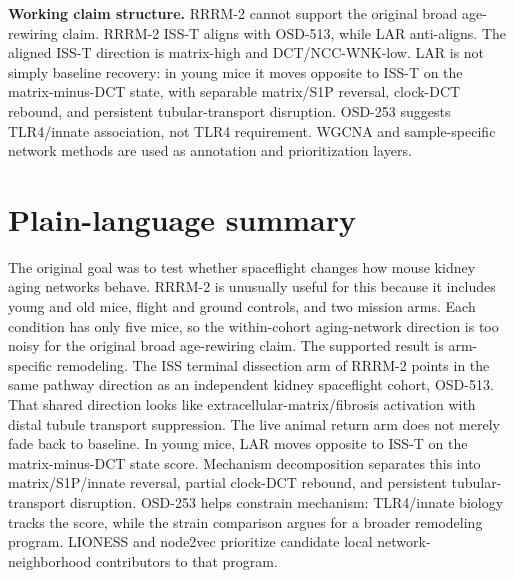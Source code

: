 \documentclass[11pt]{article}
\begin{document}
\vspace{0.8em}
\noindent\textbf{Working claim structure.}
RRRM-2 cannot support the original broad age-rewiring claim. RRRM-2 ISS-T aligns with OSD-513, while LAR anti-aligns. The aligned ISS-T direction is matrix-high and DCT/NCC-WNK-low. LAR is not simply baseline recovery: in young mice it moves opposite to ISS-T on the matrix-minus-DCT state, with separable matrix/S1P reversal, clock-DCT rebound, and persistent tubular-transport disruption. OSD-253 suggests TLR4/innate association, not TLR4 requirement. WGCNA and sample-specific network methods are used as annotation and prioritization layers.

\clearpage

\section*{Plain-language summary}

\noindent
The original goal was to test whether spaceflight changes how mouse kidney aging networks behave. RRRM-2 is unusually useful for this because it includes young and old mice, flight and ground controls, and two mission arms. Each condition has only five mice, so the within-cohort aging-network direction is too noisy for the original broad age-rewiring claim. The supported result is arm-specific remodeling. The ISS terminal dissection arm of RRRM-2 points in the same pathway direction as an independent kidney spaceflight cohort, OSD-513. That shared direction looks like extracellular-matrix/fibrosis activation with distal tubule transport suppression. The live animal return arm does not merely fade back to baseline. In young mice, LAR moves opposite to ISS-T on the matrix-minus-DCT state score. Mechanism decomposition separates this into matrix/S1P/innate reversal, partial clock-DCT rebound, and persistent tubular-transport disruption. OSD-253 helps constrain mechanism: TLR4/innate biology tracks the score, while the strain comparison argues for a broader remodeling program. LIONESS and node2vec prioritize candidate local network-neighborhood contributors to that program.

\vspace{0.8em}
\end{document}
